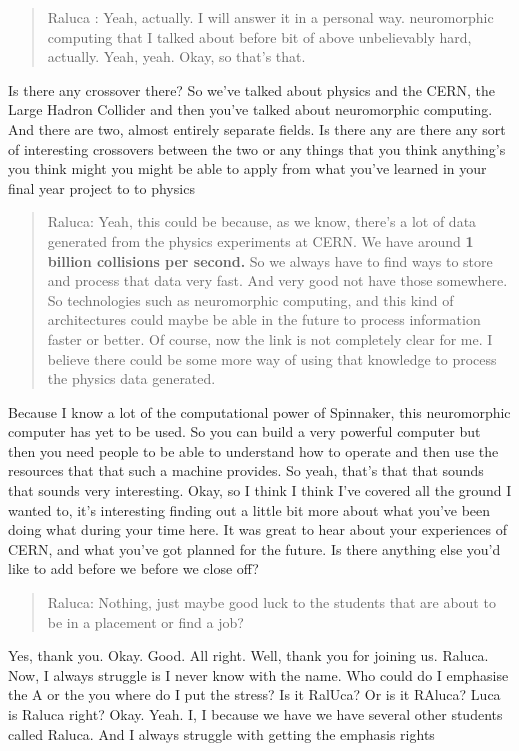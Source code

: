 \documentclass[
]{book}
\begin{document}
\begin{quote}
Raluca : Yeah, actually. I will answer it in a personal way. neuromorphic computing that I talked about before bit of above unbelievably hard, actually. Yeah, yeah. Okay, so that's that.
\end{quote}

Is there any crossover there? So we've talked about physics and the CERN, the Large Hadron Collider and then you've talked about neuromorphic computing. And there are two, almost entirely separate fields. Is there any are there any sort of interesting crossovers between the two or any things that you think anything's you think might you might be able to apply from what you've learned in your final year project to to physics

\begin{quote}
Raluca: Yeah, this could be because, as we know, there's a lot of data generated from the physics experiments at CERN. We have around \textbf{1 billion collisions per second.} So we always have to find ways to store and process that data very fast. And very good not have those somewhere. So technologies such as neuromorphic computing, and this kind of architectures could maybe be able in the future to process information faster or better. Of course, now the link is not completely clear for me. I believe there could be some more way of using that knowledge to process the physics data generated.
\end{quote}

Because I know a lot of the computational power of Spinnaker, this neuromorphic computer has yet to be used. So you can build a very powerful computer but then you need people to be able to understand how to operate and then use the resources that that such a machine provides. So yeah, that's that that sounds that sounds very interesting. Okay, so I think I think I've covered all the ground I wanted to, it's interesting finding out a little bit more about what you've been doing what during your time here. It was great to hear about your experiences of CERN, and what you've got planned for the future. Is there anything else you'd like to add before we before we close off?

\begin{quote}
Raluca: Nothing, just maybe good luck to the students that are about to be in a placement or find a job?
\end{quote}

Yes, thank you. Okay. Good. All right. Well, thank you for joining us. Raluca. Now, I always struggle is I never know with the name. Who could do I emphasise the A or the you where do I put the stress? Is it RalUca? Or is it RAluca? Luca is Raluca right? Okay. Yeah. I, I because we have we have several other students called Raluca. And I always struggle with getting the emphasis rights
\end{document}
